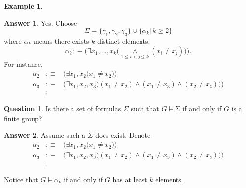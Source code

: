 \documentclass[11pt,letterpaper]{book}
\theoremstyle{definition}
\newtheorem{example}{Example}[section]
\newtheorem{question}{Question}[section]
\newtheorem{answer}{Answer}[section]
\begin{document}
\begin{example}
     \begin{answer}
       Yes. Choose $$\Sigma = \bigg\{ \gamma_1, \gamma_2, \gamma_3 \bigg\}
\cup \bigg\{ \alpha_k \big|\,  k \geq 2 \bigg\} $$
       where $\alpha_k$ means there exists $k$ distinct elements:
\begin{equation}\label{eq:sentence_distinct_k_elements}
\alpha_k :\equiv \bigg( \exists x_1, \ldots, x_k \Big(
\underset{1 \leq i < j \leq k}{\land}
(x_i \neq x_j)  \Big)  \bigg).
\end{equation}
For instance,
\begin{eqnarray*}
     \alpha_2& :\equiv &  \bigg( \exists x_1, x_2 \Big( x_1 \neq x_2
\Big)  \bigg) \\
     \alpha_3& :\equiv &  \bigg( \exists x_1, x_2, x_3 \Big( (x_1 \neq
x_2) \land ( x_1 \neq x_3) \land ( x_2 \neq x_3)  \Big) \bigg) \\
    & \vdots &
\end{eqnarray*}

     \end{answer}

     \begin{question}
       Is there a set of formulas $\Sigma$ such that $G \models \Sigma $
if and only if $G$ is a finite group?
     \end{question}
     \begin{answer}
       Assume such a $\Sigma$ does exist. Denote
\begin{eqnarray*}
     \alpha_2& :\equiv &  \bigg( \exists x_1, x_2 \Big( x_1 \neq x_2
\Big)  \bigg) \\
     \alpha_3& :\equiv &  \bigg( \exists x_1, x_2, x_3 \Big( (x_1 \neq
x_2) \land ( x_1 \neq x_3) \land ( x_2 \neq x_3)  \Big) \bigg) \\
    & \vdots &
\end{eqnarray*}
     \end{answer}

Notice that $G \models \alpha_k$ if and only if $G$ has at least $k$
elements.


\end{example}
\end{document}

